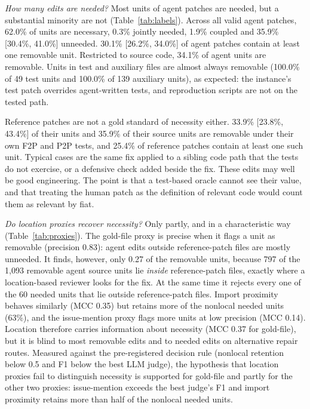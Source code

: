 \documentclass[a4paper,fleqn]{cas-sc}
\newcommand{\rqtwoAgentAuxUnits}{139}
\newcommand{\rqtwoAgentAuxUnneeded}{100.0\%}
\newcommand{\rqtwoAgentPatchesUnneeded}{30.1\%}
\newcommand{\rqtwoAgentPatchesUnneededCI}{[26.2\%, 34.0\%]}
\newcommand{\rqtwoAgentShareC}{1.9\%}
\newcommand{\rqtwoAgentShareJ}{0.3\%}
\newcommand{\rqtwoAgentShareN}{62.0\%}
\newcommand{\rqtwoAgentShareU}{35.9\%}
\newcommand{\rqtwoAgentShareUCI}{[30.4\%, 41.0\%]}
\newcommand{\rqtwoAgentSrcUnneeded}{34.1\%}
\newcommand{\rqtwoAgentTestUnits}{49}
\newcommand{\rqtwoAgentTestUnneeded}{100.0\%}
\newcommand{\rqtwoGoldPatchesUnneeded}{25.4\%}
\newcommand{\rqtwoGoldShareU}{33.9\%}
\newcommand{\rqtwoGoldShareUCI}{[23.8\%, 43.4\%]}
\newcommand{\rqtwoGoldSrcUnneeded}{35.9\%}
\newcommand{\rqtwoMccPdep}{0.35}
\newcommand{\rqtwoMccPgoldfile}{0.37}
\newcommand{\rqtwoMccPissue}{0.14}
\newcommand{\rqtwoNonlocalNeeded}{60}
\newcommand{\rqtwoPrecPgoldfile}{0.83}
\newcommand{\rqtwoRecPgoldfile}{0.27}
\newcommand{\rqtwoRetPdep}{63\%}
\newcommand{\rqtwoSrcUnneededN}{1{,}093}
\newcommand{\rqtwoUnneededInGold}{797}
\begin{document}
\emph{How many edits are needed?} Most units of agent patches are needed, but a substantial minority are not (Table~\ref{tab:labels}). Across all valid agent patches, \rqtwoAgentShareN{} of units are necessary, \rqtwoAgentShareJ{} jointly needed, \rqtwoAgentShareC{} coupled and \rqtwoAgentShareU{} \rqtwoAgentShareUCI{} unneeded. \rqtwoAgentPatchesUnneeded{} \rqtwoAgentPatchesUnneededCI{} of agent patches contain at least one removable unit. Restricted to source code, \rqtwoAgentSrcUnneeded{} of agent units are removable. Units in test and auxiliary files are almost always removable (\rqtwoAgentTestUnneeded{} of \rqtwoAgentTestUnits{} test units and \rqtwoAgentAuxUnneeded{} of \rqtwoAgentAuxUnits{} auxiliary units), as expected: the instance's test patch overrides agent-written tests, and reproduction scripts are not on the tested path.

Reference patches are not a gold standard of necessity either. \rqtwoGoldShareU{} \rqtwoGoldShareUCI{} of their units and \rqtwoGoldSrcUnneeded{} of their source units are removable under their own F2P and P2P tests, and \rqtwoGoldPatchesUnneeded{} of reference patches contain at least one such unit. Typical cases are the same fix applied to a sibling code path that the tests do not exercise, or a defensive check added beside the fix. These edits may well be good engineering. The point is that a test-based oracle cannot see their value, and that treating the human patch as the definition of relevant code would count them as relevant by fiat.

\emph{Do location proxies recover necessity?} Only partly, and in a characteristic way (Table~\ref{tab:proxies}). The gold-file proxy is precise when it flags a unit as removable (precision \rqtwoPrecPgoldfile{}): agent edits outside reference-patch files are mostly unneeded. It finds, however, only \rqtwoRecPgoldfile{} of the removable units, because \rqtwoUnneededInGold{} of the \rqtwoSrcUnneededN{} removable agent source units lie \emph{inside} reference-patch files, exactly where a location-based reviewer looks for the fix. At the same time it rejects every one of the \rqtwoNonlocalNeeded{} needed units that lie outside reference-patch files. Import proximity behaves similarly (MCC \rqtwoMccPdep{}) but retains more of the nonlocal needed units (\rqtwoRetPdep{}), and the issue-mention proxy flags more units at low precision (MCC \rqtwoMccPissue{}). Location therefore carries information about necessity (MCC \rqtwoMccPgoldfile{} for gold-file), but it is blind to most removable edits and to needed edits on alternative repair routes. Measured against the pre-registered decision rule (nonlocal retention below 0.5 and F1 below the best LLM judge), the hypothesis that location proxies fail to distinguish necessity is supported for gold-file and partly for the other two proxies: issue-mention exceeds the best judge's F1 and import proximity retains more than half of the nonlocal needed units.
\end{document}
